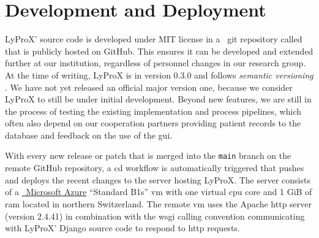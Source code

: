 \documentclass[\relativeRoot/main.tex]{subfiles}
\begin{document}
\section{Development and Deployment}
\label{sec:lyprox:dev}

LyProX' source code is developed under MIT license in a ~git \cite{torvalds_git_2022} repository called  that is publicly hosted on GitHub. This ensures it can be developed and extended further at our institution, regardless of personnel changes in our research group. At the time of writing, LyProX is in version 0.3.0 and follows \emph{semantic versioning} \cite{preston-werner_semantic_nodate}. We have not yet released an official major version one, because we consider LyProX to still be under initial development. Beyond new features, we are still in the process of testing the existing implementation and process pipelines, which often also depend on our cooperation partners providing patient records to the database and feedback on the use of the \gls{gui}.

With every new release or patch that is merged into the \texttt{main} branch on the remote GitHub repository, a \gls{cd} workflow is automatically triggered that pushes and deploys the recent changes to the server hosting LyProX. The server consists of a \href{https://azure.microsoft.com/}{~Microsoft Azure} ``Standard B1s'' \gls{vm} with one virtual \acrshort{cpu} core and 1 GiB of \acrshort{ram} located in northern Switzerland. The remote \gls{vm} uses the Apache \acrshort{http} server (version 2.4.41) \cite{mccool_apache_nodate} in combination with the \acrshort{wsgi} calling convention \cite{eby_python_2010} communicating with LyProX' Django source code to respond to \acrshort{http} requests.
\end{document}
